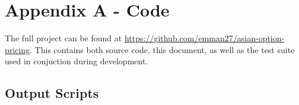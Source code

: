 \documentclass{article}
\begin{document}
\section{Appendix A - Code}

\sloppy
The full project can be found at \url{https://github.com/emman27/asian-option-pricing}. This contains both source code, this document, as well as the test suite used in conjuction during development.

\subsection{Output Scripts}

\scriptsize

\normalsize

\scriptsize

\normalsize




\end{document}
